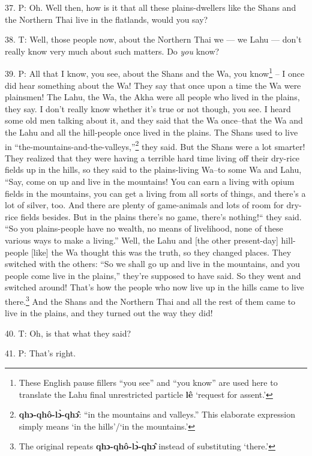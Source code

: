 37. P: Oh. Well then, how is it that all these plains-dwellers like the Shans and
the Northern Thai live in the flatlands, would you say?

38. T: Well, those people now, about the Northern Thai we --- we Lahu --- don't
really know very much about such matters. Do \textit{you} know?

39. P: All that I know, you see, about the Shans and the Wa, you know\footnote{These English pause fillers ``you see'' and ``you know'' are used here to translate the Lahu final unrestricted particle \textbf{lê} `request for assent.'} -- I once
did hear something about the Wa! They say that once upon a time the Wa were plainsmen!
The Lahu, the Wa, the Akha were all people who lived in the plains, they say. I
don't really know whether it's true or not though, you see. I heard some old men
talking about it, and they said that the Wa once--that the Wa and the Lahu and
all the hill-people once lived in the plains. The Shans used to live in ``the-mountains-and-the-valleys,''\footnote{\textbf{qhɔ-qhô-lɔ̀-qhɔ̂}: ``in the mountains and valleys.'' This elaborate expression simply means `in the hills'/`in the mountains.'}
they said. But the Shans were a lot smarter! They realized that they were having
a terrible hard time living off their dry-rice fields up in the hills, so they
said to the plains-living Wa--to some Wa and Lahu, ``Say, come on up and
live in the mountains! You can earn a living with opium fields in the mountains,
you can get a living from all sorts of things, and there's a lot of silver, too.
And there are plenty of game-animals and lots of room for dry-rice fields besides.
But in the plains there's no game, there's nothing!`` they said. ``So
you plains-people have no wealth, no means of livelihood, none of these various
ways to make a living.'' Well, the Lahu and [the other present-day] hill-people
[like] the Wa thought this was the truth, so they changed places. They switched
with the others: ``So we shall go up and live in the mountains, and you people
come live in the plains,'' they're supposed to have said. So they went
and switched around! That's how the people who now live up in the hills came to
live there.\footnote{The original repeats \textbf{qhɔ-qhô-lɔ̀-qhɔ̂} instead of substituting `there.'} And the Shans and the Northern Thai and all the rest of them came
to live in the plains, and they turned out the way they did!

40. T: Oh, is that what they said?

41. P: That's right.


